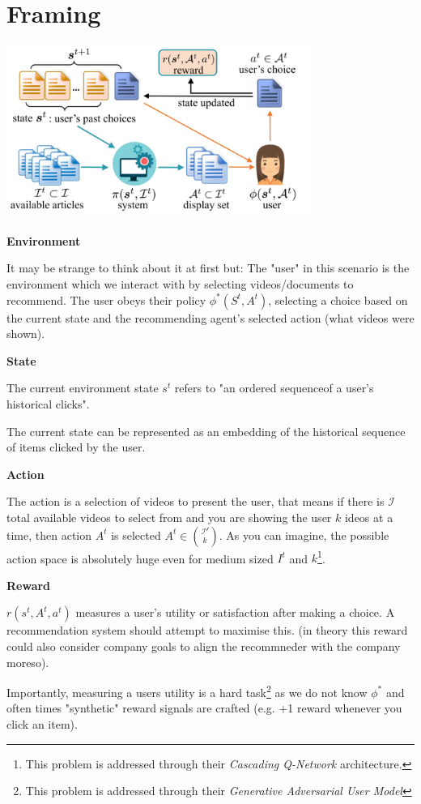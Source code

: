 \documentclass{article}
\begin{document}
    \section{Framing}
    \includegraphics[width=10cm]{fig1.png}
    
    \textbf{Environment}

    It may be strange to think about it at first but:
    The "user" in this scenario is the environment which we interact with by selecting videos/documents to recommend. The user obeys their policy $\phi ^* (S^t, A^t)$, selecting a choice based on the current state and the recommending agent's selected action (what videos were shown).

    \textbf{State}

    The current environment state $s^t$ refers to "an ordered sequenceof a user’s historical clicks".

    The current state can be represented as an embedding of the historical sequence of items clicked by the user.

    \textbf{Action}

    The action is a selection of videos to present the user, that means if there is $\mathcal{I}$ total available videos to select from and you are showing the user $k$ ideos at a time, then action $A^t$ is selected $A^t \in {\mathcal{I^t} \choose k}$. As you can imagine, the possible action space is absolutely huge even for medium sized $I^t$ and $k$\footnote{This problem is addressed through their \emph{Cascading Q-Network} architecture.}. 

    \textbf{Reward}

    $r(s^t, A^t, a^t)$ measures a user's utility or satisfaction after making a choice. A recommendation system should attempt to maximise this. (in theory this reward could also consider company goals to align the recommneder with the company moreso).

    Importantly, measuring a users utility is a hard task\footnote{This problem is addressed through their \emph{Generative Adversarial User Model}} as we do not know $\phi ^*$ and often times "synthetic" reward signals are crafted (e.g. +1 reward whenever you click an item).
\end{document}
